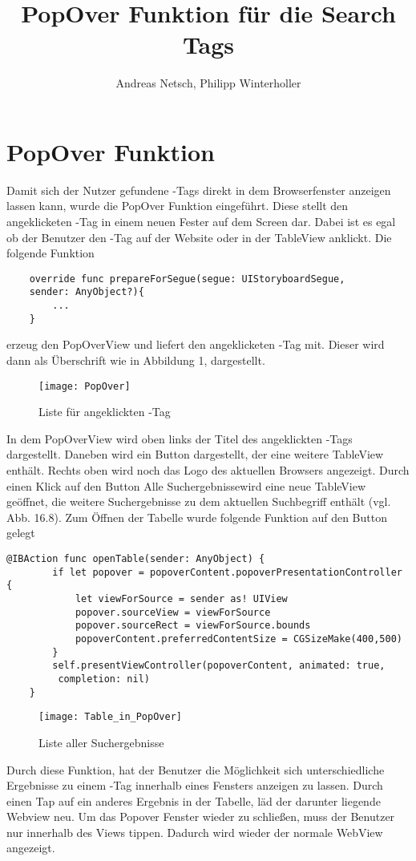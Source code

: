 
\title{PopOver Funktion für die Search Tags}
\author{Andreas Netsch, Philipp Winterholler}

\section{PopOver Funktion}

Damit sich der Nutzer gefundene \SEARCH-Tags direkt in dem Browserfenster anzeigen lassen kann, wurde die PopOver Funktion eingeführt. Diese stellt den angeklicketen \SEARCH-Tag in einem neuen Fester auf dem Screen dar. Dabei ist es egal ob der Benutzer den \SEARCH-Tag auf der Website oder in der TableView anklickt.
Die folgende Funktion 
\begin{lstlisting}
    override func prepareForSegue(segue: UIStoryboardSegue, 
    sender: AnyObject?){
        ...
    }
\end{lstlisting}

erzeug den PopOverView und liefert den angeklicketen \SEARCH-Tag mit. Dieser wird dann als Überschrift wie in Abbildung 1, dargestellt. 
\begin{figure}[h]
    \centering
    \texttt{[image: PopOver]}
    \caption{Liste für angeklickten \SEARCH-Tag}
    \label{fig:angeklickt}
\end{figure}
In dem PopOverView wird oben links der Titel des angeklickten \SEARCH-Tags dargestellt. Daneben wird ein Button dargestellt, der eine weitere TableView enthält. Rechts oben wird noch das Logo des aktuellen Browsers angezeigt. Durch einen Klick auf den Button \glqq Alle Suchergebnisse\grqq  wird eine neue TableView geöffnet, die weitere Suchergebnisse zu dem aktuellen Suchbegriff enthält (vgl. Abb. 16.8). Zum Öffnen der Tabelle wurde folgende Funktion auf den Button gelegt
\begin{lstlisting}
@IBAction func openTable(sender: AnyObject) {
        if let popover = popoverContent.popoverPresentationController {
            let viewForSource = sender as! UIView
            popover.sourceView = viewForSource
            popover.sourceRect = viewForSource.bounds
            popoverContent.preferredContentSize = CGSizeMake(400,500)
        }        
        self.presentViewController(popoverContent, animated: true,
         completion: nil)
    }
\end{lstlisting}
\begin{figure}[h]
    \centering
    \texttt{[image: Table\_in\_PopOver]}
    \caption{Liste aller Suchergebnisse}
    \label{fig:Alle Suchergebnisse}
\end{figure}
Durch diese Funktion, hat der Benutzer die Möglichkeit sich unterschiedliche Ergebnisse zu einem \SEARCH-Tag innerhalb eines Fensters anzeigen zu lassen. Durch einen Tap auf ein anderes Ergebnis in der Tabelle, läd der darunter liegende Webview neu. Um das Popover Fenster wieder zu schließen, muss der Benutzer nur innerhalb des Views tippen. Dadurch wird wieder der normale WebView angezeigt.
